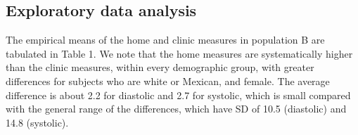 \documentclass[
]{article}
\begin{document}
\hypertarget{exploratory-data-analysis}{%
\subsection{Exploratory data analysis}\label{exploratory-data-analysis}}

The empirical means of the home and clinic measures in population B are tabulated in Table 1. We note that the home measures are systematically higher than the clinic measures, within every demographic group, with greater differences for subjects who are white or Mexican, and female.
The average difference is about 2.2 for diastolic and 2.7 for systolic, which is small compared with the general range of the differences, which have SD of
10.5 (diastolic) and 14.8 (systolic).

\begin{table}[!h]


\end{table}
\end{document}
